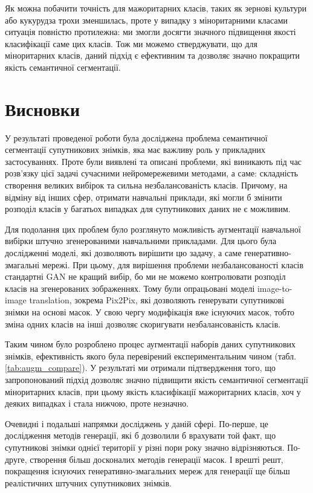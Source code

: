 \documentclass{ConfFTI}
\begin{document}
Як можна побачити точність для мажоритарних класів, таких як
зернові культури або кукурудза трохи зменшилась,
проте у випадку з міноритарними класами ситуація повністю протилежна:
ми змогли досягти значного підвищення якості класифікації саме цих класів.
Тож ми можемо стверджувати, що для міноритарних класів, даний
підхід є ефективним та дозволяє значно покращити якість
семантичної сегментації.


\section*{Висновки}

У результаті проведеної роботи була досліджена проблема
семантичної сегментації супутникових знімків, яка має важливу
роль у прикладних застосуваннях. Проте були виявлені та описані
проблеми, які виникають під час розв'язку цієї задачі сучасними
нейромережевими методами, а саме: складність створення великих
вибірок та сильна незбалансованість класів. Причому, на відміну від
інших сфер, отримати навчальні приклади, які могли б змінити розподіл
класів у багатьох випадках для супутникових даних не є можливим.

Для подолання цих проблем було розглянуто можливість аугментації
навчальної вибірки штучно згенерованими навчальними прикладами.
Для цього була дослідженні моделі, які дозволяють вирішити цю задачу,
а саме генеративно-змагальні мережі. При цьому, для вирішення проблеми
незбалансованості класів стандартні GAN не кращий вибір, бо
ми не можемо контролювати розподіл класів на згенерованих зображеннях.
Тому були опрацьовані моделі image-to-image translation, зокрема Pix2Pix,
які дозволяють генерувати супутникові знімки на основі масок.
У свою чергу модифікація вже існуючих масок, тобто зміна одних
класів на інші дозволяє скоригувати незбалансованість класів.

Таким чином було розроблено процес аугментації наборів даних супутникових
знімків, ефективність якого була перевірений експериментальним чином (табл. \ref{tab:augm_compare}).
У результаті ми отримали підтвердження того, що запропонований
підхід дозволяє значно підвищити якість семантичної сегментації
міноритарних класів, при цьому якість класифікації мажоритарних класів, хоч
у деяких випадках і стала нижчою, проте незначно.

Очевидні і подальші напрямки досліджень у даній сфері. По-перше, це
дослідження методів генерації, які б дозволили б врахувати той факт,
що супутникові знімки однієї території у різні пори року значно відрізняються.
По-друге, створення більш досконалих методів генерації масок.
І врешті решт, покращення існуючих генеративно-змагальних мереж
для генерації ще більш реалістичних штучних супутникових знімків.





\raggedend
\end{document}

